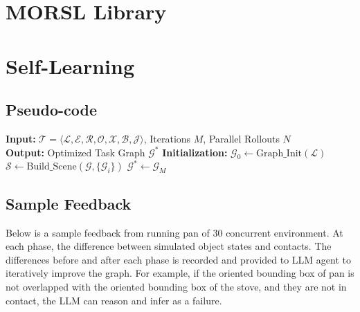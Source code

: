 \section{MORSL Library}



\section{Self-Learning}
\subsection{Pseudo-code}
\begin{algorithm}[H]
\scriptsize 
\DontPrintSemicolon
\caption{Rehearsal-based Graph Optimization}
\label{alg:graph_opt_full}
\noindent\textbf{Input:} $\mathcal{T} = \langle \mathcal{L}, \mathcal{E}, \mathcal{R}, \mathcal{O}, \mathcal{X}, \mathcal{B}, \mathcal{J} \rangle$,  Iterations $M$, Parallel Rollouts $N$\\
\noindent\textbf{Output:} Optimized Task Graph $\mathcal{G}^*$
\BlankLine
\textbf{Initialization:}\;
$\mathcal{G}_0 \leftarrow \mathrm{Graph\_Init}(\mathcal{L})$\;
\quad{}
$\mathcal{S} \leftarrow \mathrm{Build\_Scene}(\mathcal{G}, \{\mathcal{G}_i\})$\;
\quad{}
\Return $\mathcal{G}^* \leftarrow \mathcal{G}_M$\;
\end{algorithm}

\subsection{Sample Feedback}
Below is a sample feedback from running pan of 30 concurrent environment. At each phase, the difference between simulated object states and contacts. The differences  before and after each phase is recorded and provided to LLM agent to iteratively improve the graph. For example, if the oriented bounding box of pan is not overlapped with the oriented bounding box of the stove, and they are not in contact, the LLM can reason and infer as a failure.


